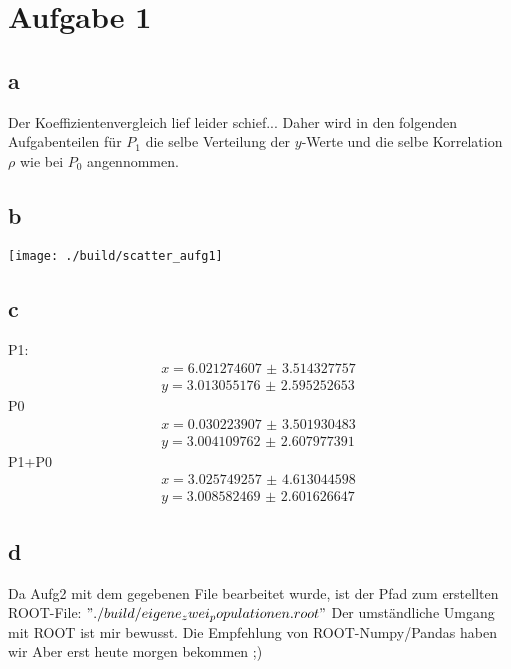 \newpage\section{Aufgabe 1}
\subsection{a}
Der Koeffizientenvergleich lief leider schief...
Daher wird in den folgenden Aufgabenteilen für $P_1$ die selbe Verteilung der $y$-Werte und die selbe Korrelation $\rho$ wie bei $P_0$ angennommen.
\subsection{b}
\begin{center}
\texttt{[image: ./build/scatter\_aufg1]}
\end{center}
\subsection{c}
P1:
\begin{align}
x = \SI{6.021274607(3514327757)}{}\\
y = \SI{3.013055176(2595252653)}{}
\end{align}
P0
\begin{align}
x = \SI{0.030223907(3501930483)}{}\\
y = \SI{3.004109762(2607977391)}{}
\end{align}
P1+P0
\begin{align}
x = \SI{3.025749257(4613044598)}{}\\
y = \SI{3.008582469(2601626647)}{}
\end{align}
\subsection{d}
Da Aufg2 mit dem gegebenen File bearbeitet wurde, ist der Pfad zum erstellten ROOT-File: $"./build/eigene_zwei_populationen.root"$
\newline
\newline
Der umständliche Umgang mit ROOT ist mir bewusst. Die Empfehlung von ROOT-Numpy/Pandas haben wir Aber erst heute morgen bekommen ;)
